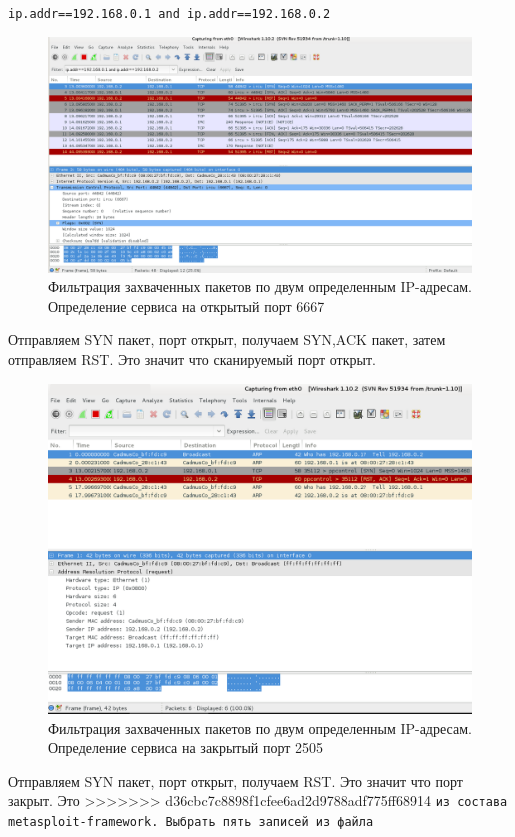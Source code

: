 \documentclass[12pt,a4paper]{article}
\begin{document}
\verb+ip.addr==192.168.0.1 and ip.addr==192.168.0.2+
\FloatBarrier
\begin{figure}[h!]
\centering
\includegraphics[scale=0.3]{res/scan1}
\caption{Фильтрация захваченных пакетов по двум определенным IP-адресам. Определение сервиса на открытый порт 6667 }
\end{figure}
\FloatBarrier
Отправляем SYN пакет, порт открыт, получаем SYN,ACK пакет, затем отправляем RST. Это значит что сканируемый порт открыт.
\FloatBarrier
\begin{figure}[h!]
\centering
\includegraphics[scale=0.38]{res/scan2}
\caption{Фильтрация захваченных пакетов по двум определенным IP-адресам. Определение сервиса на закрытый порт 2505 }
\end{figure}
\FloatBarrier
Отправляем SYN пакет, порт открыт, получаем RST. Это значит что порт закрыт.
Это 
>>>>>>> d36cbc7c8898f1cfee6ad2d9788adf775ff68914
\verb+из состава metasploit-framework. Выбрать пять записей из файла+
\end{document}
